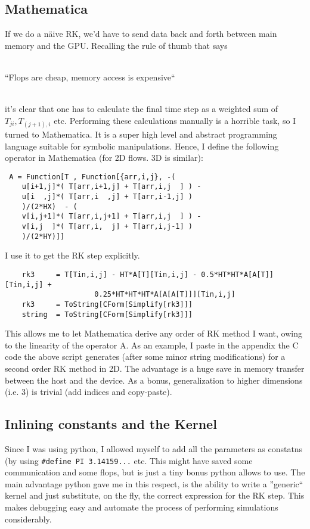 \documentclass[paper=a4, fontsize=11pt]{scrartcl} %
\numberwithin{equation}{section} %
\numberwithin{figure}{section} %
\numberwithin{table}{section} %
\newcommand{\coder}[1]{\texttt{#1}}
\begin{document}
\subsection{Mathematica} 
If we do a n\"aive RK, we'd have to
send data back and forth between main memory and the GPU. Recalling the rule of thumb that says 
\\
\\
\centerline{\Large{``Flops are cheap, memory access is expensive``}}
\\

 it's clear that one has to calculate the final time step as a weighted sum of $T_{ji}, T_{(j+1),i}$ etc. 
Performing these calculations manually is a horrible task, so I turned to Mathematica. It is a super high level and abstract
programming language suitable for symbolic manipulations. 
Hence, I define the following operator in Mathematica (for 2D flows. 3D is similar):

\begin{verbatim}
 A = Function[T , Function[{arr,i,j}, -(
    u[i+1,j]*( T[arr,i+1,j] + T[arr,i,j  ] ) -
    u[i  ,j]*( T[arr,i  ,j] + T[arr,i-1,j] )
    )/(2*HX)  - (
    v[i,j+1]*( T[arr,i,j+1] + T[arr,i,j  ] ) - 
    v[i,j  ]*( T[arr,i,  j] + T[arr,i,j-1] )
    )/(2*HY)]]
\end{verbatim}

I use it to get the RK step explicitly.
\begin{verbatim}
    rk3     = T[Tin,i,j] - HT*A[T][Tin,i,j] - 0.5*HT*HT*A[A[T]][Tin,i,j] + 
                   	 0.25*HT*HT*HT*A[A[A[T]]][Tin,i,j]
    rk3     = ToString[CForm[Simplify[rk3]]]
    string  = ToString[CForm[Simplify[rk3]]]
\end{verbatim}

This allows me to let Mathematica derive any order of RK method I want, owing to the linearity of the operator A. 
As an example, I paste in the appendix the C code the above script generates (after some minor string modifications) for a
second order RK method in 2D. 
The advantage is a huge save in memory transfer between the host and the device. As a bonus, generalization to higher
dimensions (i.e. 3) is trivial (add indices and copy-paste).

\subsection{Inlining constants and the Kernel}
Since I was using python, I allowed myself to add all the parameters as constatns (by using \coder{\#define PI 3.14159...} etc. This 
might have saved some communication and some flops, but is just a tiny bonus python allows to use. The main advantage python gave me
in this respect, is the ability to write a ''generic`` kernel and just substitute, on the fly, the correct expression for the RK step.
This makes debugging easy and automate the process of performing simulations considerably.
\end{document}
